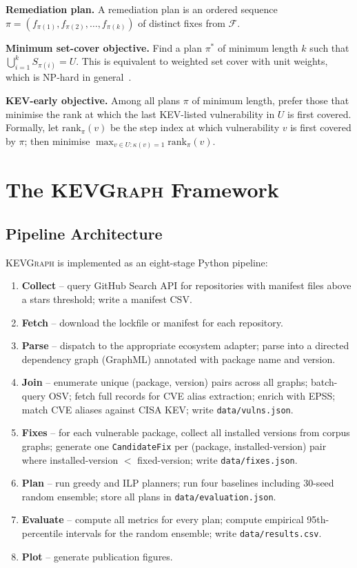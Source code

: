 \documentclass[conference]{IEEEtran}
\newcommand{\kevgraph}{\textsc{KEVGraph}\xspace}
\begin{document}
\textbf{Remediation plan.}  A remediation plan is an ordered sequence
$\pi = (f_{\pi(1)}, f_{\pi(2)}, \ldots, f_{\pi(k)})$ of distinct
fixes from $\mathcal{F}$.

\textbf{Minimum set-cover objective.}  Find a plan $\pi^*$ of minimum
length $k$ such that $\bigcup_{i=1}^{k} S_{\pi(i)} = U$.  This is
equivalent to weighted set cover with unit weights, which is NP-hard in
general~\cite{garey_johnson}.

\textbf{KEV-early objective.}  Among all plans $\pi$ of minimum length,
prefer those that minimise the rank at which the last KEV-listed
vulnerability in $U$ is first covered.  Formally, let
$\mathrm{rank}_\pi(v)$ be the step index at which vulnerability $v$ is
first covered by $\pi$; then minimise
$\max_{v \in U : \kappa(v)=1} \mathrm{rank}_\pi(v)$.

\section{The \kevgraph Framework}
\label{sec:method}

\subsection{Pipeline Architecture}

\kevgraph is implemented as an eight-stage Python pipeline:

\begin{enumerate}
  \item \textbf{Collect} -- query GitHub Search API for repositories
        with manifest files above a stars threshold; write a manifest
        CSV.
  \item \textbf{Fetch} -- download the lockfile or manifest for each
        repository.
  \item \textbf{Parse} -- dispatch to the appropriate ecosystem adapter;
        parse into a directed dependency graph (GraphML) annotated with
        package name and version.
  \item \textbf{Join} -- enumerate unique (package, version) pairs
        across all graphs; batch-query OSV; fetch full records for CVE
        alias extraction; enrich with EPSS; match CVE aliases against
        CISA KEV; write \texttt{data/vulns.json}.
  \item \textbf{Fixes} -- for each vulnerable package, collect all
        installed versions from corpus graphs; generate one
        \texttt{CandidateFix} per (package, installed-version) pair
        where installed-version $<$ fixed-version; write
        \texttt{data/fixes.json}.
  \item \textbf{Plan} -- run greedy and ILP planners; run four
        baselines including 30-seed random ensemble; store all plans in
        \texttt{data/evaluation.json}.
  \item \textbf{Evaluate} -- compute all metrics for every plan;
        compute empirical 95th-percentile intervals for the random
        ensemble; write \texttt{data/results.csv}.
  \item \textbf{Plot} -- generate publication figures.
\end{enumerate}
\end{document}
